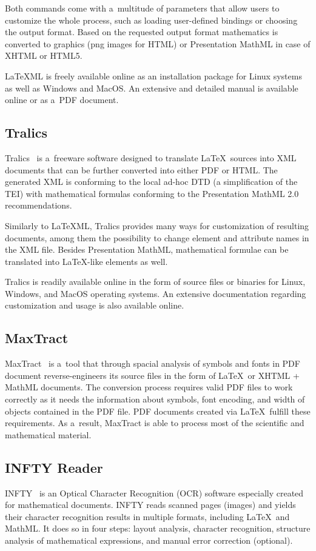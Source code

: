 \documentclass[11pt,oneside,final]{fithesis2}
\begin{document}
Both commands come with a~multitude of parameters that allow users to customize the whole process, such as loading user-defined bindings or choosing the output format. Based on the requested output format mathematics is converted to graphics (png images for HTML) or Presentation MathML in case of XHTML or HTML5. 

\LaTeX ML is freely available online as an installation package for Linux systems as well as Windows and MacOS. An extensive and detailed manual is available online or as a~PDF document.

\subsection{Tralics}
Tralics~\cite{tralics:grimm2003,dml:Grimm2010} is a~freeware software designed to translate \LaTeX\ sources into XML documents that can be further converted into either PDF or HTML. The generated XML is conforming to the local ad-hoc DTD (a simplification of the TEI) with mathematical formulas conforming to the Presentation MathML 2.0 recommendations.

Similarly to \LaTeX ML, Tralics provides many ways for customization of resulting documents, among them the possibility to change element and attribute names in the XML file. Besides Presentation MathML, mathematical formulae can be translated into \LaTeX -like   elements as well.

Tralics is readily available online in the form of source files or binaries for Linux, Windows, and MacOS operating systems. An extensive documentation regarding customization and usage is also available online. 

\subsection{MaxTract}
MaxTract~\cite{baker2012maxtract} is a~tool that through spacial analysis of symbols and fonts in PDF document reverse-engineers its source files in the form of \LaTeX\ or XHTML + MathML documents. The conversion process requires valid PDF files to work correctly as it needs the information about symbols, font encoding, and width of objects contained in the PDF file. PDF documents created via \LaTeX\ fulfill these requirements. As a~result, MaxTract is able to process most of the scientific and mathematical material.


\subsection{INFTY Reader}
INFTY~\cite{suzuki2003infty} is an Optical Character Recognition (OCR) software especially created for mathematical documents. INFTY reads scanned pages (images) and yields their character recognition results in multiple formats, including \LaTeX\ and MathML. It does so in four steps: layout analysis, character recognition, structure analysis of mathematical expressions, and manual error correction (optional). 
\end{document}
